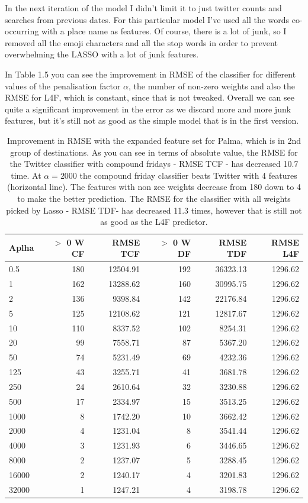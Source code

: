 \documentclass[minf,frontabs,twoside,singlespacing,parskip]{infthesis}
\begin{document}
In the next iteration of the model I didn't limit it to just twitter counts and searches from previous dates. For this particular model I've used all the words co-occurring with a place name as features. Of course, there is a lot of junk, so I removed all the emoji characters and all the stop words in order to prevent overwhelming the LASSO with a lot of junk features.

In Table 1.5 you can see the improvement in RMSE of the classifier for different values of the penalisation factor $\alpha$, the number of non-zero weights and also the RMSE for L4F, which is constant, since that is not tweaked. Overall we can see quite a significant improvement in the error as we discard more and more junk features, but it's still not as good as the simple model that is in the first version. 

\begin{table}[pt]
\begin{center}
\begin{tabular}{ l | r | r | r | r | r}
Aplha & $>$ 0 W CF & RMSE TCF & $>$ 0 W DF & RMSE TDF & RMSE L4F  \\
\hline
0.5 & 180 & 12504.91 & 192  & 36323.13 & 1296.62  \\
1 & 162 & 13288.62 & 160  & 30995.75 & 1296.62  \\
2 & 136 & 9398.84  & 142  & 22176.84 & 1296.62  \\
5 & 125 & 12108.62 & 121 & 12817.67 & 1296.62 \\
10 & 110 & 8337.52  & 102 & 8254.31 & 1296.62 \\
20 & 99& 7558.71 & 87 & 5367.20 & 1296.62 \\
50 & 74& 5231.49 & 69 & 4232.36 & 1296.62 \\
125 & 43 & 3255.71 & 41 & 3681.78 & 1296.62 \\
250 & 24 & 2610.64 & 32 & 3230.88 & 1296.62 \\
500 & 17 & 2334.97 & 15 & 3513.25 & 1296.62 \\
1000 & 8 & 1742.20 & 10 & 3662.42 & 1296.62 \\
\hline
2000 & 4 & 1231.04 & 8  & 3541.44 & 1296.62 \\
4000 & 3 & 1231.93 & 6 & 3446.65 & 1296.62 \\
8000 & 2 & 1237.07 & 5 & 3288.45 & 1296.62 \\
16000 & 2 & 1240.17 & 4 & 3201.83 & 1296.62 \\
32000 & 1 & 1247.21 & 4 & 3198.78 & 1296.62 \\
\end{tabular}
\end{center}
\caption{Improvement in RMSE with the expanded feature set for Palma, which is in 2nd group of destinations.  As you can see in terms of absolute value, the RMSE for the Twitter classifier with compound fridays - RMSE TCF - has decreased 10.7 time. At $\alpha=2000$ the compound friday classifier beats Twitter with 4 features (horizontal line). The features with non zee weights decrease from 180 down to 4 to make the better prediction.  The RMSE for the classifier with all weights picked by Lasso - RMSE TDF- has decreased 11.3 times, however that is still not as good as the L4F predictor.}
\end{table}
\end{document}
